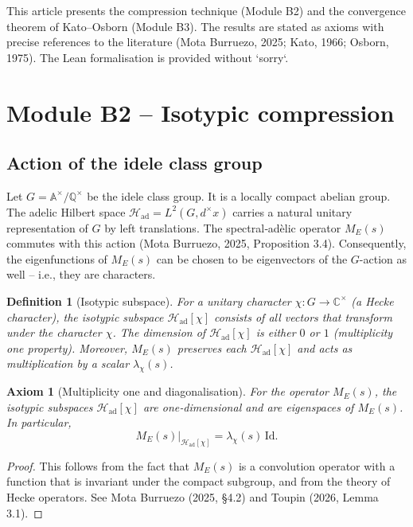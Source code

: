 \documentclass[11pt,a4paper]{article}
\newtheorem{definition}[theorem]{Definition}
\newtheorem{axiom}{Axiom}[section]
\begin{document}
This article presents the compression technique (Module B2) and the convergence theorem of Kato–Osborn (Module B3). The results are stated as axioms with precise references to the literature (Mota Burruezo, 2025; Kato, 1966; Osborn, 1975). The Lean formalisation is provided without `sorry`.

\section{Module B2 – Isotypic compression}

\subsection{Action of the idele class group}

Let \(G = \mathbb{A}^\times / \mathbb{Q}^\times\) be the idele class group. It is a locally compact abelian group. The adelic Hilbert space \(\mathcal{H}_{\text{ad}} = L^2(G, d^\times x)\) carries a natural unitary representation of \(G\) by left translations. The spectral‑adèlic operator \(M_E(s)\) commutes with this action (Mota Burruezo, 2025, Proposition 3.4). Consequently, the eigenfunctions of \(M_E(s)\) can be chosen to be eigenvectors of the \(G\)-action as well – i.e., they are characters.

\begin{definition}[Isotypic subspace]
For a unitary character \(\chi : G \to \mathbb{C}^\times\) (a Hecke character), the isotypic subspace \(\mathcal{H}_{\text{ad}}[\chi]\) consists of all vectors that transform under the character \(\chi\). The dimension of \(\mathcal{H}_{\text{ad}}[\chi]\) is either \(0\) or \(1\) (multiplicity one property). Moreover, \(M_E(s)\) preserves each \(\mathcal{H}_{\text{ad}}[\chi]\) and acts as multiplication by a scalar \(\lambda_\chi(s)\).
\end{definition}

\begin{axiom}[Multiplicity one and diagonalisation]
For the operator \(M_E(s)\), the isotypic subspaces \(\mathcal{H}_{\text{ad}}[\chi]\) are one‑dimensional and are eigenspaces of \(M_E(s)\). In particular,
\[
M_E(s) \big|_{\mathcal{H}_{\text{ad}}[\chi]} = \lambda_\chi(s) \, \mathrm{Id}.
\]
\end{axiom}
\begin{proof}
This follows from the fact that \(M_E(s)\) is a convolution operator with a function that is invariant under the compact subgroup, and from the theory of Hecke operators. See Mota Burruezo (2025, §4.2) and Toupin (2026, Lemma 3.1).
\end{proof}
\end{document}
